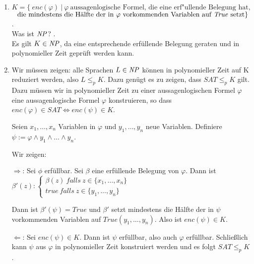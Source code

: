     \LOES
    \begin{enumerate}
        \item $K = \{\ enc(\varphi)\ |\ \varphi\ \text{aussagenlogische\ Formel,\ die\ eine\ erf"ullende\ Belegung\ hat,}$ \\
            $\text{\ \ die\ mindestens\ die\ Hälfte\ der\ in\ $\varphi$\ vorkommenden\ Variablen\ auf\ $\MT{True}$\ setzt} \}$. \\

            Was ist $\mathit{NP}$? . \\
            Es gilt $K \in \mathit{NP}$, da eine entsprechende erfüllende Belegung geraten und in polynomieller Zeit geprüft werden kann.

        \item Wir müssen zeigen: alle Sprachen $L \in \mathit{NP}$ können in polynomieller Zeit auf K reduziert werden, also $L \leq_{p} K$. Dazu genügt es zu zeigen, dass $SAT \leq_{p} K$ gilt. Dazu müssen wir in polynomieller Zeit zu einer aussagenlogischen Formel $\varphi$ eine aussagenlogische Formel $\varphi$ konstruieren, so dass $enc(\varphi) \in SAT \Leftrightarrow enc(\psi) \in K$.

        Seien $x_{1}, \dots, x_{n}$ Variablen in $\varphi$ und $y_{1}, \dots, y_{n}$ neue Variablen. Definiere $\psi := \varphi \land y_{1} \land \dots \land y_{n}$.

        Wir zeigen:

        $\Rightarrow$: Sei $\phi$ erfüllbar. Sei $\beta$ eine erfüllende Belegung von $\varphi$. Dann ist $\beta'(z):{}
        \begin{cases}
            \beta(z)\ falls\ z \in \{ x_{1}, \dots, x_{n} \} \\
            true\ falls\ z \in \{ y_{1}, \dots, y_{n} \}
        \end{cases}$

        Dann ist $\beta'(\psi) = True$ und $\beta'$ setzt mindestens die Hälfte der in $\psi$ vorkommenden Variablen auf $True (y_{1},\dots,y_{n})$. Also ist $enc(\psi) \in K$.

        $\Leftarrow$: Sei $enc(\psi) \in K$. Dann ist $\psi$ erfüllbar, also auch $\varphi$ erfüllbar. Schließlich kann $\psi$ aus $\varphi$ in polynomieller Zeit konstruiert werden und es folgt $SAT \leq_{p} K$.
    \end{enumerate}


